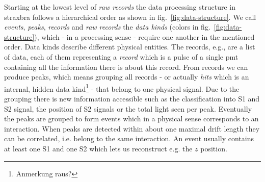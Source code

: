 Starting at the lowest level of \emph{raw records} the data processing structure in straxbra follows a hierarchical order as shown in fig.~\ref{fig:data-structure}.
We call \emph{events}, \emph{peaks}, \emph{records} and \emph{raw records} the \emph{data kinds} (colors in fig.~\ref{fig:data-structure}), which - in a processing sense - require one another in the mentioned order.
Data kinds describe different physical entities.
The records, e.g., are a list of data, each of them representing a \emph{record} which is a pulse of a single \gls{pmt} containing all the information there is about this record.
From records we can produce peaks, which means grouping all records - or actually \emph{hits} which is an internal, hidden data kind\footnote{Anmerkung raus?} - that belong to one physical signal.
Due to the grouping there is new information accessible such as the classification into S1 and S2 signal, the position of S2 signals or the total light seen per peak.
Eventually the peaks are grouped to form events which in a physical sense corresponds to an interaction.
When peaks are detected within about one maximal drift length they can be correlated, i.e. belong to the same interaction.
An event usually contains at least one S1 and one S2 which lets us reconstruct e.g. the $ z $ position.

